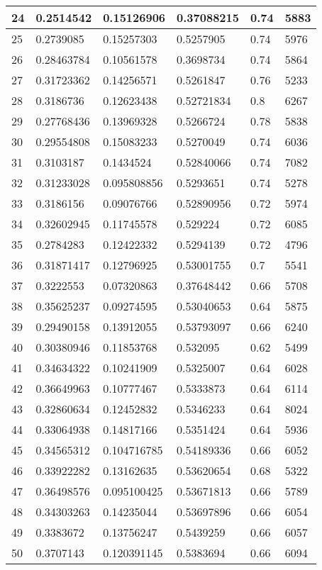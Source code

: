 \begin{longtable}{|l|l|l|l|l|l|}
24 & 0.2514542 & 0.15126906 & 0.37088215 & 0.74 & 5883 \\ \hline 
25 & 0.2739085 & 0.15257303 & 0.5257905 & 0.74 & 5976 \\ \hline 
26 & 0.28463784 & 0.10561578 & 0.3698734 & 0.74 & 5864 \\ \hline 
27 & 0.31723362 & 0.14256571 & 0.5261847 & 0.76 & 5233 \\ \hline 
28 & 0.3186736 & 0.12623438 & 0.52721834 & 0.8 & 6267 \\ \hline 
29 & 0.27768436 & 0.13969328 & 0.5266724 & 0.78 & 5838 \\ \hline 
30 & 0.29554808 & 0.15083233 & 0.5270049 & 0.74 & 6036 \\ \hline 
31 & 0.3103187 & 0.1434524 & 0.52840066 & 0.74 & 7082 \\ \hline 
32 & 0.31233028 & 0.095808856 & 0.5293651 & 0.74 & 5278 \\ \hline 
33 & 0.3186156 & 0.09076766 & 0.52890956 & 0.72 & 5974 \\ \hline 
34 & 0.32602945 & 0.11745578 & 0.529224 & 0.72 & 6085 \\ \hline 
35 & 0.2784283 & 0.12422332 & 0.5294139 & 0.72 & 4796 \\ \hline 
36 & 0.31871417 & 0.12796925 & 0.53001755 & 0.7 & 5541 \\ \hline 
37 & 0.3222553 & 0.07320863 & 0.37648442 & 0.66 & 5708 \\ \hline 
38 & 0.35625237 & 0.09274595 & 0.53040653 & 0.64 & 5875 \\ \hline 
39 & 0.29490158 & 0.13912055 & 0.53793097 & 0.66 & 6240 \\ \hline 
40 & 0.30380946 & 0.11853768 & 0.532095 & 0.62 & 5499 \\ \hline 
41 & 0.34634322 & 0.10241909 & 0.5325007 & 0.64 & 6028 \\ \hline 
42 & 0.36649963 & 0.10777467 & 0.5333873 & 0.64 & 6114 \\ \hline 
43 & 0.32860634 & 0.12452832 & 0.5346233 & 0.64 & 8024 \\ \hline 
44 & 0.33064938 & 0.14817166 & 0.5351424 & 0.64 & 5936 \\ \hline 
45 & 0.34565312 & 0.104716785 & 0.54189336 & 0.66 & 6052 \\ \hline 
46 & 0.33922282 & 0.13162635 & 0.53620654 & 0.68 & 5322 \\ \hline 
47 & 0.36498576 & 0.095100425 & 0.53671813 & 0.66 & 5789 \\ \hline 
48 & 0.34303263 & 0.14235044 & 0.53697896 & 0.66 & 6054 \\ \hline 
49 & 0.3383672 & 0.13756247 & 0.5439259 & 0.66 & 6057 \\ \hline 
50 & 0.3707143 & 0.120391145 & 0.5383694 & 0.66 & 6094 \\ \hline 
\end{longtable}
